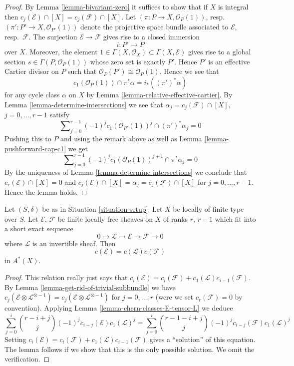 \begin{proof}
By Lemma \ref{lemma-bivariant-zero}
it suffices to show that if $X$ is integral
then $c_j(\mathcal{E}) \cap [X] = c_j(\mathcal{F}) \cap [X]$.
Let $(\pi : P \to X, \mathcal{O}_P(1))$,
resp. $(\pi' : P' \to X, \mathcal{O}_{P'}(1))$ denote the
projective space bundle associated to $\mathcal{E}$, resp.\ $\mathcal{F}$.
The surjection $\mathcal{E} \to \mathcal{F}$ gives rise
to a closed immersion
$$
i : P' \longrightarrow P
$$
over $X$. Moreover, the element
$1 \in \Gamma(X, \mathcal{O}_X) \subset \Gamma(X, \mathcal{E})$
gives rise to a global section $s \in \Gamma(P, \mathcal{O}_P(1))$
whose zero set is exactly $P'$. Hence $P'$ is an effective Cartier
divisor on $P$ such that $\mathcal{O}_P(P') \cong \mathcal{O}_P(1)$.
Hence we see that
$$
c_1(\mathcal{O}_P(1)) \cap \pi^*\alpha = i_*((\pi')^*\alpha)
$$
for any cycle class $\alpha$ on $X$ by
Lemma \ref{lemma-relative-effective-cartier}.
By Lemma \ref{lemma-determine-intersections} we see that
$\alpha_j = c_j(\mathcal{F}) \cap [X]$, $j = 0, \ldots, r - 1$
satisfy
$$
\sum\nolimits_{j = 0}^{r - 1} (-1)^jc_1(\mathcal{O}_{P'}(1))^j
\cap (\pi')^*\alpha_j = 0
$$
Pushing this to $P$ and using the remark above as well as
Lemma \ref{lemma-pushforward-cap-c1} we get
$$
\sum\nolimits_{j = 0}^{r - 1}
(-1)^j c_1(\mathcal{O}_P(1))^{j + 1}
\cap \pi^*\alpha_j = 0
$$
By the uniqueness of Lemma \ref{lemma-determine-intersections}
we conclude that
$c_r(\mathcal{E}) \cap [X] = 0$ and
$c_j(\mathcal{E}) \cap [X] = \alpha_j = c_j(\mathcal{F}) \cap [X]$
for $j = 0, \ldots, r - 1$. Hence the lemma holds.
\end{proof}

\begin{lemma}
\label{lemma-additivity-invertible-subsheaf}
Let $(S, \delta)$ be as in Situation \ref{situation-setup}.
Let $X$ be locally of finite type over $S$.
Let $\mathcal{E}$, $\mathcal{F}$ be finite locally free sheaves
on $X$ of ranks $r$, $r - 1$ which fit into a short
exact sequence
$$
0 \to \mathcal{L} \to \mathcal{E} \to \mathcal{F} \to 0
$$
where $\mathcal{L}$ is an invertible sheaf.
Then
$$
c(\mathcal{E}) = c(\mathcal{L}) c(\mathcal{F})
$$
in $A^*(X)$.
\end{lemma}

\begin{proof}
This relation really just says that
$c_i(\mathcal{E}) = c_i(\mathcal{F}) + c_1(\mathcal{L})c_{i - 1}(\mathcal{F})$.
By Lemma \ref{lemma-get-rid-of-trivial-subbundle}
we have $c_j(\mathcal{E} \otimes \mathcal{L}^{\otimes -1})
= c_j(\mathcal{E} \otimes \mathcal{L}^{\otimes -1})$ for
$j = 0, \ldots, r$ (were we set $c_r(\mathcal{F}) = 0$ by
convention).
Applying Lemma \ref{lemma-chern-classes-E-tensor-L} we deduce
$$
\sum_{j = 0}^i
\binom{r - i + j}{j} (-1)^j c_{i - j}({\mathcal E}) c_1({\mathcal L})^j
=
\sum_{j = 0}^i
\binom{r - 1 - i + j}{j} (-1)^j c_{i - j}({\mathcal F}) c_1({\mathcal L})^j
$$
Setting
$c_i(\mathcal{E}) = c_i(\mathcal{F}) + c_1(\mathcal{L})c_{i - 1}(\mathcal{F})$
gives a ``solution'' of this equation. The lemma follows if we show
that this is the only possible solution. We omit the verification.
\end{proof}

